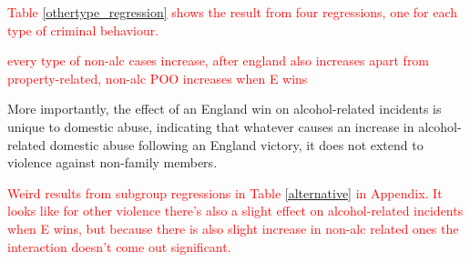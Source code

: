 \documentclass[12pt, letterpaper]{article}
\begin{document}
\textcolor{red}{Table \ref{othertype_regression} shows the result from four regressions, one for each type of criminal behaviour.} 

\textcolor{red}{every type of non-alc cases increase, after england also increases apart from property-related, non-alc POO increases when E wins}
 

 More importantly, the effect of an England win on alcohol-related incidents is unique to domestic abuse, indicating that whatever causes an increase in alcohol-related domestic abuse following an England victory, it does not extend to violence against non-family members. 

\textcolor{red}{Weird results from subgroup regressions in Table \ref{alternative} in Appendix. It looks like for other violence there's also a slight effect on alcohol-related incidents when E wins, but because there is also slight increase in non-alc related ones the interaction doesn't come out significant.}
\end{document}
